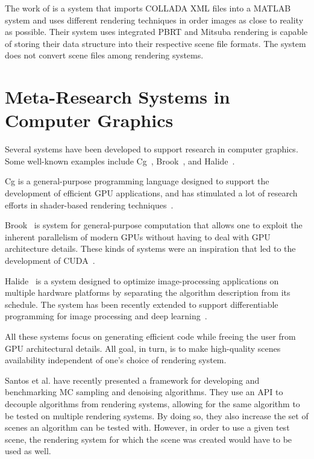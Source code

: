 The work of \cite{rendertoolbox} is a system that imports COLLADA XML files into a MATLAB system and uses different rendering techniques in order images as close to 
reality as possible. Their system uses integrated PBRT and Mitsuba rendering is capable of storing their data structure into their respective scene file 
formats. The system does not convert scene files among rendering systems. 

\section{Meta-Research Systems in Computer Graphics}

Several systems have been developed to support research in computer graphics. Some well-known examples include Cg~\cite{Mark2003}, Brook~\cite{Buck2004}, and Halide~\cite{Ragan-Kelley2012}.

Cg is a general-purpose programming language designed to support the development of efficient GPU applications, and has stimulated a lot of research efforts in shader-based rendering techniques~\cite{Policarpo2005, Policarpo2006, Wyman2005, Oliveira2007RRT}.  

Brook~\cite{Buck2004} is system for general-purpose computation that allows one to exploit the inherent parallelism of modern GPUs without having to deal with GPU architecture details. These kinds of systems were an inspiration that led to the development of CUDA~\cite{Nickolls2008}.

Halide~\cite{Ragan-Kelley2012} is a system designed to optimize image-processing applications on multiple hardware platforms by separating the algorithm description from its schedule. The system has been recently extended to support differentiable programming for image processing and deep learning~\cite{Li2018-Halide-Diff_Prog}. 

All these systems focus on generating efficient code while freeing the user from GPU architectural details. All goal, in turn, is to make high-quality scenes availability independent of one's choice of rendering system. 

Santos et al. \cite{Santos:2018:FBKSD} have recently presented a framework for developing and benchmarking MC sampling and denoising algorithms. They use an API to decouple algorithms from rendering systems, allowing for the same algorithm to be tested on multiple rendering systems. By doing so, they also increase the set of scenes an algorithm can be tested with. However, in order to use a given test scene, the rendering system for which the scene was created would have to be used as well. 

